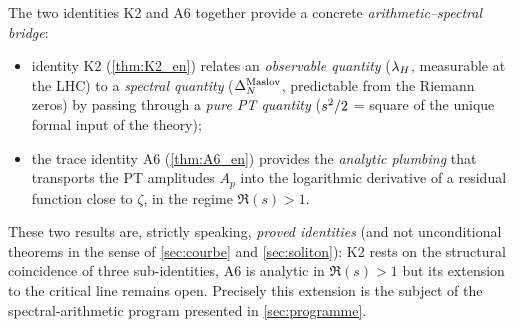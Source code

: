 The two identities K2 and A6 together provide a concrete \emph{arithmetic--spectral bridge}:
\begin{itemize}[nosep,leftmargin=*]
\item identity K2 (\ref{thm:K2_en}) relates an \emph{observable quantity} ($\lambda_H$, measurable at the LHC) to a \emph{spectral quantity} ($\Delta_N^{\rm Maslov}$, predictable from the Riemann zeros) by passing through a \emph{pure PT quantity} ($s^{2}/2$ = square of the unique formal input of the theory);
\item the trace identity A6 (\ref{thm:A6_en}) provides the \emph{analytic plumbing} that transports the PT amplitudes $A_p$ into the logarithmic derivative of a residual function close to $\zeta$, in the regime $\Re(s) > 1$.
\end{itemize}
These two results are, strictly speaking, \emph{proved identities} (and not unconditional theorems in the sense of \ref{sec:courbe} and \ref{sec:soliton}): K2 rests on the structural coincidence of three sub-identities, A6 is analytic in $\Re(s) > 1$ but its extension to the critical line remains open. Precisely this extension is the subject of the spectral-arithmetic program presented in \ref{sec:programme}.
